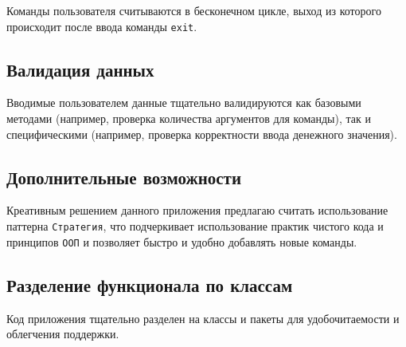 \documentclass[a4paper, 14pt]{article}
\begin{document}
Команды пользователя считываются в бесконечном цикле, выход из которого происходит после ввода команды \texttt{exit}.

\subsection{Валидация данных}

Вводимые пользователем данные тщательно валидируются как базовыми методами (например, проверка количества аргументов для команды), так и специфическими (например, проверка корректности ввода денежного значения).

\subsection{Дополнительные возможности}

Креативным решением данного приложения предлагаю считать использование паттерна \texttt{Стратегия}, что подчеркивает использование практик чистого кода и принципов \texttt{ООП} и позволяет быстро и удобно добавлять новые команды.

\subsection{Разделение функционала по классам}

Код приложения тщательно разделен на классы и пакеты для удобочитаемости и облегчения поддержки.
\fi
\end{document}
